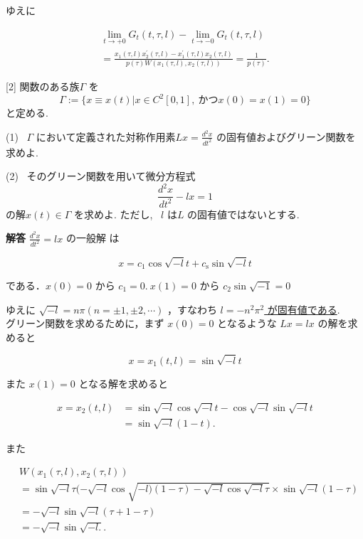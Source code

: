 \documentclass{jsarticle}
\begin{document}
ゆえに

$$
\begin{gathered}
\lim _{t \rightarrow+0} G_{t}(t, \tau, l)-\lim _{t \rightarrow-0} G_{t}(t, \tau, l) \\
=\frac{x_{1}(\tau, l) x_{2}^{\prime}(\tau, l)-x_{1}^{\prime}(\tau, l) x_{2}(\tau, l)}{p(\tau) W\left(x_{1}(\tau, l), x_{2}(\tau, l)\right)}=\frac{1}{p(\tau)} .
\end{gathered}
$$

\bigskip
\bigskip

\begin{itembox}[l]{[2]}
関数のある族$\Gamma$ を 
$$
\Gamma := \{x\equiv x(t) | x \in C^2[0,1], \ かつx(0) = x(1) = 0 \}
$$
と定める. 

(1) \ 
$\Gamma$ において定義された対称作用素$L x=\frac{d^{2} x}{d t^{2}}$ の固有値およびグリーン関数を求めよ.

(2) \ 
そのグリーン関数を用いて微分方程式
$$
\frac{d^{2} x}{d t^{2}}-l x = 1
$$
の解$x(t) \in \Gamma$ を求めよ. ただし, \ $l$ は$L$ の固有値ではないとする.
\end{itembox}

\textbf{解答}
$\frac{d^{2} x}{d t^{2}} = lx$ の一般解 は

$$
x = c_{1} \cos \sqrt{-l}t+c_{\mathrm{s}} \sin \sqrt{-l}t
$$

である．$x(0)=0$ から $c_{1}=0. \ x(1)=0$ から
$c_{2} \sin \sqrt{-1}=0$

ゆえに $\sqrt{-l}=n \pi(n= \pm 1, \pm 2, \cdots)$ ，すなわち
\underline{$l = -n^2\pi^2$ が固有値である}.\\
グリーン関数を求めるために，まず $x(0)=0$ となるような $L x=l x$ の解を求めると

$$
x=x_{1}(t, l)=\sin \sqrt{-l} t
$$

また $x(1)=0$ となる解を求めると

$$
\begin{aligned}
x=x_{2}(t, l) & =\sin \sqrt{-l} \cos \sqrt{-l}t -\cos \sqrt{-l} \sin \sqrt{-l}t \\
&= \sin \sqrt{-l}(1-t) .
\end{aligned}
$$

また

$$
\begin{aligned}
& W\left(x_{1}(\tau, l), x_{2}(\tau, l)\right) \\
&= \sin \sqrt{-l}\tau(-\sqrt{-l} \cos \sqrt{-l)(1-\tau)-\sqrt{-l} \cos \sqrt{-l}\tau} \times \sin \sqrt{-l}(1-\tau) \\
&=-\sqrt{-l} \sin \sqrt{-l}(\tau+1-\tau)\\
&=-\sqrt{-l} \sin \sqrt{-l .} .
\end{aligned}
$$
\end{document}
